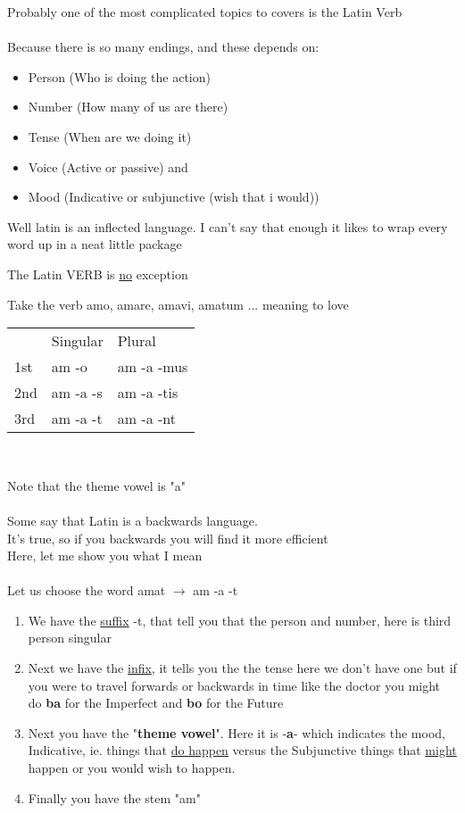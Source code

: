 Probably one of the most complicated topics to covers is the 
Latin Verb \\ \\
Because there is so many endings, and these depends on:
\begin{itemize}
  \item Person (Who is doing the action)
  \item Number (How many of us are there)
  \item Tense  (When are we doing it)
  \item Voice  (Active or passive) and
  \item Mood   (Indicative or subjunctive (wish that i would))
\end{itemize}
Well latin is an inflected language. I can't say that enough 
it likes to wrap every word up in a neat little package \\ 
\begin{center}
  The Latin VERB is \underline{no} exception
\end{center} 
Take the verb amo, amare, amavi, amatum ... meaning to love 
\begin{center}
  \begin{tabular}{lll}
    & Singular & Plural \\ 
    1st & am -o & am -a -mus \\ 
    2nd & am -a -s & am -a -tis \\ 
    3rd & am -a -t & am -a -nt \\
  \end{tabular} \\
\end{center} 
Note that the theme vowel is "a" \\ \\ 
Some say that Latin is a backwards language. \\ 
It's true, so if you backwards you will find it more efficient \\ 
Here, let me show you what I mean \\ \\ 
Let us choose the word amat $\longrightarrow$ am -a -t
\begin{enumerate}[I]
  \item We have the \underline{suffix} -t, that tell you that the person 
    and number, here is third person singular 
  \item Next we have the \underline{infix}, it tells you the the tense here
    we don't have one but if you were to travel forwards or backwards in time like the doctor
    you might do \textbf{ba} for the Imperfect and \textbf{bo} for the Future
  \item Next you have the "\textbf{theme vowel}". Here it is -\textbf{a}- which indicates the mood, Indicative, ie. things that
    \underline{do happen} versus the Subjunctive things that \underline{might} happen or you 
    would wish to happen. 
  \item Finally you have the stem "am" 
\end{enumerate}
